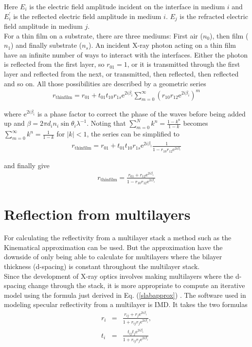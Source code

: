 Here $E_i$ is the electric field amplitude incident on the interface in medium $i$ and $E_i^{'}$ is the reflected electric field amplitude in medium $i$. $E_j$ is the refracted electric field amplitude in medium $j$.\\

For a thin film on a substrate, there are three mediums: First air ($n_0$), then film ($n_1$) and finally substrate ($n_s$). An incident X-ray photon acting on a thin film have an infinite number of ways to interact with the interfaces. Either the photon is reflected from the first layer, so $r_{01} = 1$, or it is transmitted through the first layer and reflected from the next, or transmitted, then reflected, then reflected and so on. All those possibilities are described by a geometric series
\begin{eqnarray}
	r_{\mathrm{thin film}} = r_{01} + t_{01}t_{10}r_{1s}\mathrm{e}^{2 i \beta_i}\sum_{m=0}^{\infty}(r_{10}r_{12}\mathrm{e}^{2 i \beta_i})^m
\end{eqnarray}

where $\mathrm{e}^{2i\beta_i}$ is a phase factor to correct the phase of the waves before being added up and $\beta = 2 \pi d_i n_i \sin{\theta_i}\lambda^{-1}$. Noting that $\sum_{m=0}^{N}k^n = \frac{1 - k^n}{1-k}$ becomes $\sum_{m=0}^{\infty}k^n = \frac{1}{1-k}$ for $|k| < 1$, the series can be simplified to
\begin{eqnarray}
	r_{\mathrm{thin film}} = r_{01} + t_{01}t_{10}r_{1s}\mathrm{e}^{2i\beta_i}\frac{1}{1-r_{10}r_{12}\mathrm{e}^{2i\beta_i}}
\end{eqnarray}

and finally give
\begin{eqnarray}
	r_{\mathrm{thin film}} = \frac{r_{01} + r_{12}\mathrm{e}^{2i\beta_i}}{1-r_{10}r_{12}\mathrm{e}^{2i\beta_i}} \label{slabapprox}
\end{eqnarray}

\section{Reflection from multilayers}
For calculating the reflectivity from a multilayer stack a method such as the Kinematical approximation can be used. But the approximation have the downside of only being able to calculate for multilayers where the bilayer thickness (d-spacing) is constant throughout the multilayer stack. \\
Since the development of X-ray optics involves making multilayers where the d-spacing change through the stack, it is more appropriate to compute an iterative model using the formula just derived in Eq. (\ref{slabapprox}) . The software used in modeling specular reflectivity from a multilayer is IMD\cite{Windt:1998p3071}. It takes the two formulas
\begin{eqnarray}\label{fresnelcoef}
	r_i &=& \frac{r_{ij}+r_j\mathrm{e}^{2 i \beta_i}}{1+r_{ij}r_j\mathrm{e}^{2 i \beta_i}},\\
	t_i &=& \frac{t_{ij}t_j\mathrm{e}^{2 i \beta_i}}{1+r_{ij}r_j\mathrm{e}^{2 i \beta_i}}\\
\end{eqnarray}

